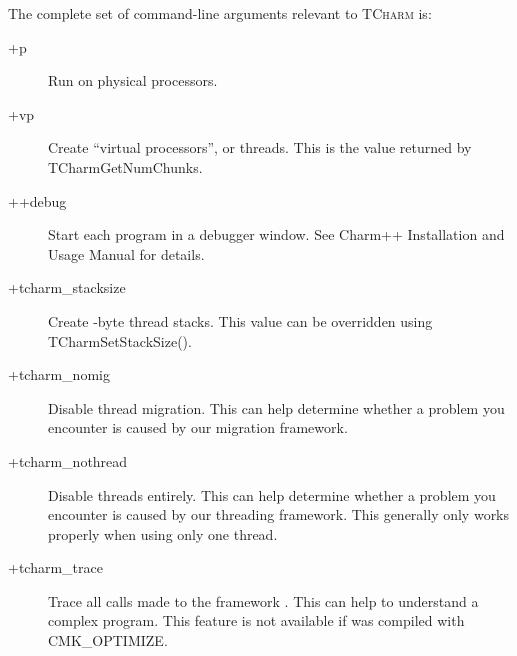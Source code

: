 \documentclass[10pt]{article}
\newcommand{\tcharm}{\textsc{TCharm}}
\begin{document}
The complete set of command-line arguments relevant to \tcharm{} is:

\begin{description}
\item[+p ] Run on  physical processors.

\item[+vp ] Create  ``virtual processors'', or threads.  This is
the value returned by TCharmGetNumChunks.

\item[++debug] Start each program in a debugger window.  See Charm++
Installation and Usage Manual for details.

\item[+tcharm\_stacksize ] Create -byte thread stacks.  This
value can be overridden using TCharmSetStackSize().

\item[+tcharm\_nomig] Disable thread migration.  This can help determine
whether a problem you encounter is caused by our migration framework.

\item[+tcharm\_nothread] Disable threads entirely.  This can help determine
whether a problem you encounter is caused by our threading framework.
This generally only works properly when using only one thread.

\item[+tcharm\_trace ] Trace all calls made to the framework .
This can help to understand a complex program.  This feature is not
available if \charmpp{} was compiled with CMK\_OPTIMIZE.

\end{description}



\end{document}
